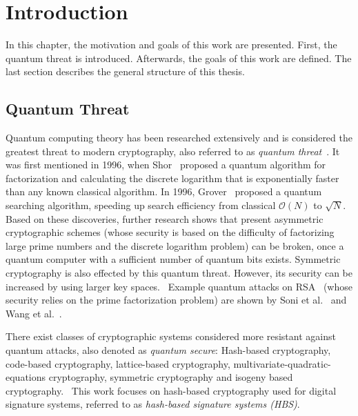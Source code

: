 \chapter{Introduction}
\label{cha:introduction}
In this chapter, the motivation and goals of this work are presented. First, the quantum threat is introduced. Afterwards, the goals of this work are defined. The last section describes the general structure of this thesis.

\section{Quantum Threat} %
Quantum computing theory has been researched extensively and is considered the greatest threat to modern cryptography, also referred to as \textit{quantum threat}~\cite{impact_quantum_crypto_2018}.
It was first mentioned in 1996, when Shor~\cite{shors_algo_original_1999} proposed a quantum algorithm for factorization and calculating the discrete logarithm that is exponentially faster than any known classical algorithm. In 1996, Grover~\cite{grovers_algo_basispaper_1997} proposed a quantum searching algorithm, speeding up search efficiency from classical $\mathcal{O}(N)$ to $\sqrt{N}$. 
Based on these discoveries, further research shows that present asymmetric cryptographic schemes (whose security is based on the difficulty of factorizing large prime numbers and the discrete logarithm problem) can be broken, once a quantum computer with a sufficient number of quantum bits exists. 
Symmetric cryptography is also effected by this quantum threat. However, its security can be increased by using larger key spaces.~\cite{impact_quantum_crypto_2018} %
Example quantum attacks on RSA~\cite{rsa_patent} (whose security relies on the prime factorization problem) are shown by Soni et al.~\cite{RSA_pq-attack_examples_2018} and Wang et al.~\cite{RSA_pq-attack_without_factorization_2018}.

There exist classes of cryptographic systems considered more resistant against quantum attacks, also denoted as \textit{quantum secure}: Hash-based cryptography, code-based cryptography, lattice-based cryptography, multivariate-quadratic-equations cryptography, symmetric cryptography and isogeny based cryptography.~\cite{book_pqc_bernstein_2004,isogeny_based_paper}
This work focuses on hash-based cryptography used for digital signature systems, referred to as \textit{hash-based signature systems (HBS)}.

